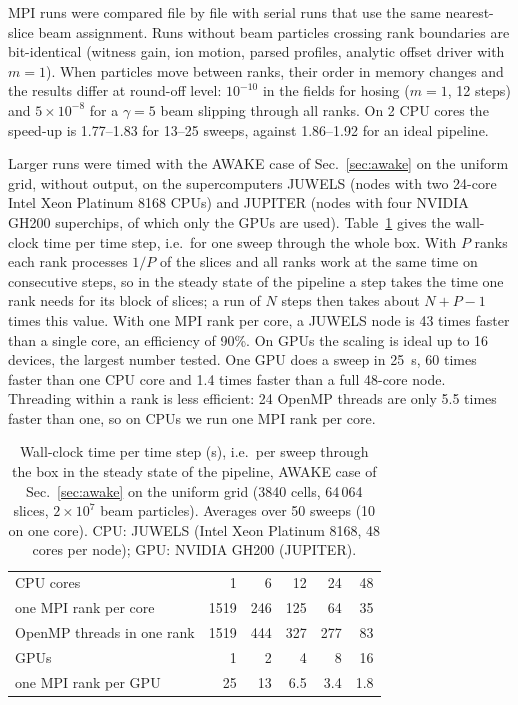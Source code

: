 \documentclass[aps,prab,reprint,floatfix,superscriptaddress,amsmath,amssymb]{revtex4-2}
\begin{document}
MPI runs were compared file by file with serial runs that use the same nearest-slice beam assignment. Runs without beam particles crossing rank boundaries are bit-identical (witness gain, ion motion, parsed profiles, analytic offset driver with $m=1$). When particles move between ranks, their order in memory changes and the results differ at round-off level: $10^{-10}$ in the fields for hosing ($m=1$, 12 steps) and $5\times10^{-8}$ for a $\gamma=5$ beam slipping through all ranks. On 2 CPU cores the speed-up is 1.77--1.83 for 13--25 sweeps, against 1.86--1.92 for an ideal pipeline.

Larger runs were timed with the AWAKE case of Sec.~\ref{sec:awake} on the uniform grid, without output, on the supercomputers JUWELS (nodes with two 24-core Intel Xeon Platinum 8168 CPUs) and JUPITER (nodes with four NVIDIA GH200 superchips, of which only the GPUs are used). Table~\ref{tab:perf} gives the wall-clock time per time step, i.e.\ for one sweep through the whole box. With $P$ ranks each rank processes $1/P$ of the slices and all ranks work at the same time on consecutive steps, so in the steady state of the pipeline a step takes the time one rank needs for its block of slices; a run of $N$ steps then takes about $N+P-1$ times this value. With one MPI rank per core, a JUWELS node is 43 times faster than a single core, an efficiency of 90\%. On GPUs the scaling is ideal up to 16 devices, the largest number tested. One GPU does a sweep in 25~s, 60 times faster than one CPU core and 1.4 times faster than a full 48-core node. Threading within a rank is less efficient: 24 OpenMP threads are only 5.5 times faster than one, so on CPUs we run one MPI rank per core.

\begin{table}[t]
\caption{Wall-clock time per time step (s), i.e.\ per sweep through the box in the steady state of the pipeline, AWAKE case of Sec.~\ref{sec:awake} on the uniform grid (3840 cells, 64\,064 slices, $2\times10^7$ beam particles). Averages over 50 sweeps (10 on one core). CPU: JUWELS (Intel Xeon Platinum 8168, 48 cores per node); GPU: NVIDIA GH200 (JUPITER).}
\label{tab:perf}
\begin{ruledtabular}
\begin{tabular}{lrrrrr}
CPU cores & 1 & 6 & 12 & 24 & 48 \\
one MPI rank per core & 1519 & 246 & 125 & 64 & 35 \\
OpenMP threads in one rank & 1519 & 444 & 327 & 277 & 83\footnotemark[1] \\ \hline
GPUs & 1 & 2 & 4 & 8 & 16 \\
one MPI rank per GPU & 25 & 13 & 6.5 & 3.4 & 1.8 \\
\end{tabular}
\end{ruledtabular}
\end{table}
\end{document}
